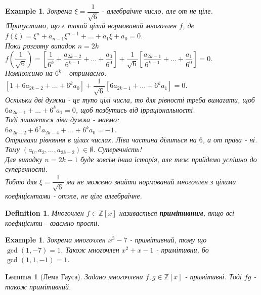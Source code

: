 \documentclass[a4paper, 10pt]{article}
\theoremstyle{theoremdd}
\theoremstyle{theoremdd}
\newtheorem{definition}[theorem]{Definition}
\theoremstyle{theoremdd}
\theoremstyle{theoremdd}
\newtheorem{example}[theorem]{Example}
\theoremstyle{theoremdd}
\theoremstyle{theoremdd}
\theoremstyle{theoremdd}
\newtheorem{lemma}[theorem]{Lemma}
\theoremstyle{theoremdd}
\begin{document}
\begin{example}
Зокрема $\xi = \dfrac{1}{\sqrt{6}}$ - алгебраїчне число, але от не ціле.\\
!Припустимо, що є такий цілий нормований многочлен $f$, де\\
$f(\xi) = \xi^n + a_{n-1} \xi^{n-1} + \dots + a_1 \xi + a_0 = 0$.\\
Поки розгляну випадок $n = 2k$\\
$f\left( \dfrac{1}{\sqrt{6}} \right) = \left[\dfrac{1}{6^k} + \dfrac{a_{2k-2}}{6^{k-1}} + \dots + \dfrac{a_0}{6^0} \right] + \dfrac{1}{\sqrt{6}} \left[ \dfrac{a_{2k-1}}{6^{k-1}} + \dots + \dfrac{a_1}{6^0} \right] = 0$.\\
Помножимо на $6^k$ - отримаємо:\\
$[1+6a_{2k-2} + \dots + 6^ka_0] + \dfrac{1}{\sqrt{6}}[6a_{2k-1} + \dots + 6^k a_1] = 0$.\\
Оскільки дві дужки - це тупо цілі числа, то для рівності треба вимагати, щоб $6a_{2k-1} + \dots + 6^k a_1 = 0$, щоб позбутись від ірраціональності.\\
Тоді лишається ліва дужка - маємо:\\
$6a_{2k-2} + 6^2a_{2k-4} + \dots + 6^k a_0 = -1$.\\
Отримали рівняння в цілих числах. Ліва частина ділиться на $6$, а от права - ні. Тому $(a_0,a_2,\dots,a_{2k-2}) \in \emptyset$. Суперечність!\\
Для випадку $n = 2k-1$ буде зовсім інша історія, але теж прийдемо успішно до суперечності.\\
Тобто для $\xi = \dfrac{1}{\sqrt{6}}$ ми не можемо знайти нормований многочлен з цілими коефіцієнтами - отже, не ціле алгебраїчне.
\end{example}

\begin{definition}
Многочлен $f \in \mathbb{Z}[x]$ називається \textbf{примітивним}, якщо всі коефіцієнти - взаємно прості.
\end{definition}

\begin{example}
Зокрема многочлен $x^3 - 7$ - примітивний, тому що \\ $\gcd(1,-7) = 1$. Також многочлен $x^2+x-1$ - примітивни, бо \\ $\gcd(1,1,-1) = 1$.
\end{example}

\begin{lemma}[Лема Гауса]
Задано многочлени $f,g \in \mathbb{Z}[x]$ - примітивні. Тоді $fg$ - також примітивний.
\end{lemma}
\end{document}
